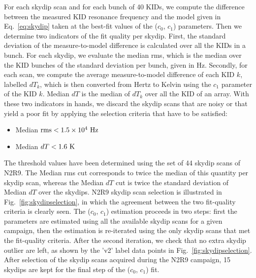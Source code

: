 For each skydip scan and for each bunch of 40 KIDs, we compute the
difference between the measured KID resonance frequency and the model
given in Eq.~\ref{eq:skydip} taken at the best-fit values of the
($c_0$, $c_1$) parameters. Then we determine two indicators of the fit
quality per skydip. First, the standard deviation of the
measure-to-model difference is calculated over all the KIDs in a
bunch. For each skydip, we evaluate the median rms, which is the
median over the KID bunches of the standard deviation per bunch, given
in Hz. Secondly, for each scan, we compute the average
measure-to-model difference of each KID $k$, labelled $dT_k$, which is
then converted from Hertz to Kelvin using the $c_1$ parameter of the
KID $k$. Median $dT$ is the median of $dT_k$ over all the KID of an
array. With these two indicators in hands, we discard the skydip scans
that are noisy or that yield a poor fit by applying the selection
criteria that have to be satisfied:

\begin{itemize}
\item Median $\rm{rms} < 1.5 \times 10^{4}~\rm{Hz}$
\item Median $dT < 1.6~\rm{K}$
\end{itemize}

The threshold values have been determined using the set of 44 skydip
scans of N2R9. The Median rms cut corresponds to twice the median of
this quantity per skydip scan, whereas the Median $dT$ cut is twice
the standard deviation of Median $dT$ over the skydips.
N2R9 skydip scan selection is illustrated in
Fig.~\ref{fig:skydipselection}, in
which the agreement between the two fit-quality criteria is clearly
seen. The ($c_0$, $c_1$) estimation proceeds in two steps: first the
parameters are estimated using all the available skydip scans for a
given campaign, then the estimation is re-iterated using the only
skydip scans that met the fit-quality criteria. After the second
iteration, we check that no extra skydip outlier are left, as shown by
the 'v2' label data points in Fig.~\ref{fig:skydipselection}. After
selection of the skydip scans acquired during the N2R9 campaign, 15
skydips are kept for the final step of the ($c_0$, $c_1$) fit. 

